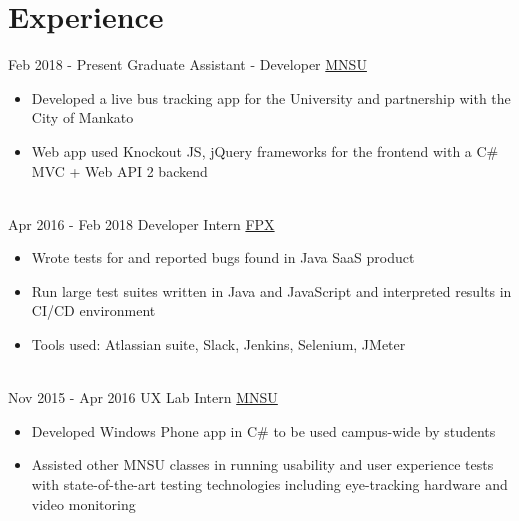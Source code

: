 \documentclass[letterpaper]{twentysecondcv} %
\begin{document}
\makeprofile %
 

\section{Experience}

\begin{twenty} %
\twentyitem
    	{Feb 2018 -}
		{Present}
        {Graduate Assistant - Developer}
        {\href{https://mankato.mnsu.edu/}{MNSU}}
        {}
        {\begin{itemize}
        \item Developed a live bus tracking app for the University and partnership with the City of Mankato
        \item Web app used Knockout JS, jQuery frameworks for the  frontend with a C\# MVC + Web API 2 backend
        \end{itemize}}
        \\
	\twentyitem
    	{Apr 2016 -}
		{Feb 2018}
        {Developer Intern}
        {\href{https://www.fpx.com}{FPX}}
        {}
        {
        {\begin{itemize}
        \item Wrote tests for and reported bugs found in Java SaaS product
        \item Run large test suites written in Java and JavaScript and interpreted results in CI/CD environment
        \item Tools used: Atlassian suite, Slack, Jenkins, Selenium, JMeter
    \end{itemize}}
        }
    \\   
    \twentyitem
   		{Nov 2015 -}
		{Apr 2016}
        {UX Lab Intern}
        {\href{https://mankato.mnsu.edu/}{MNSU}}
        {}
        {
        {\begin{itemize}
        \item Developed Windows Phone app in C\# to be used campus-wide by students
        \item Assisted other MNSU classes in running usability and user experience tests with state-of-the-art testing technologies including eye-tracking hardware and video monitoring


\end{itemize}}}
\end{twenty}
\end{document}
